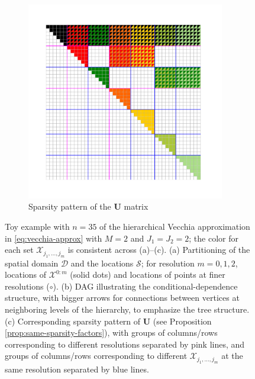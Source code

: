 \documentclass[12pt,letterpaper]{article}
\theoremstyle{propstyle}
\theoremstyle{propstyle}
\theoremstyle{propstyle}
\theoremstyle{propstyle}
\theoremstyle{propstyle}
\newcommand{\bU}{\mathbf{U}}
\newcommand{\sx}{\mathcal{X}}
\newcommand{\domain}{\mathcal{D}}
\newcommand{\locs}{\mathcal{S}}
\newcommand{\jm}{{j_1,\ldots,j_m}}
\begin{document}
\begin{figure}[!htbp]
\begin{subfigure}{.44\textwidth}
    \includegraphics[trim=0mm 12mm 0mm 12mm, clip,width=0.95\textwidth]{plots/matrix.pdf}
    \caption{Sparsity pattern of the $\bU$ matrix}
    \label{fig:sparsity-pattern}
    \end{subfigure}
    \caption{Toy example with $n=35$ of the hierarchical Vecchia approximation in \eqref{eq:vecchia-approx} with $M=2$ and $J_1=J_2=2$; the color for each set $\sx_\jm$ is consistent across (a)--(c).
    (a) Partitioning of the spatial domain $\domain$ and the locations $\locs$; for resolution $m=0,1,2$, locations of $\sx^{0:m}$ (solid dots) and locations of points at finer resolutions ($\circ$).
    (b) DAG illustrating the conditional-dependence structure, with  bigger arrows for connections between vertices at neighboring levels of the hierarchy, to emphasize the tree structure.
    (c) Corresponding sparsity pattern of $\bU$ (see Proposition \ref{prop:same-sparsity-factors}), with groups of columns/rows corresponding to different resolutions separated by pink lines, and groups of columns/rows corresponding to different $\sx_\jm$ at the same resolution separated by blue lines. }
    \label{fig:toy}
\end{figure}
\end{document}

